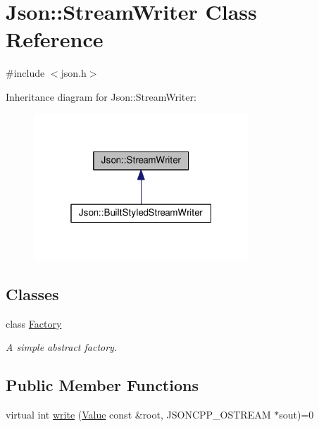 \hypertarget{class_json_1_1_stream_writer}{}\section{Json\+:\+:Stream\+Writer Class Reference}
\label{class_json_1_1_stream_writer}


{\ttfamily \#include $<$json.\+h$>$}



Inheritance diagram for Json\+:\+:Stream\+Writer\+:
\nopagebreak
\begin{figure}[H]
\begin{center}
\leavevmode
\includegraphics[width=229pt]{class_json_1_1_stream_writer__inherit__graph}
\end{center}
\end{figure}
\subsection*{Classes}
\begin{DoxyCompactItemize}
\item 
class \hyperlink{class_json_1_1_stream_writer_1_1_factory}{Factory}
\begin{DoxyCompactList}\small\item\em A simple abstract factory. \end{DoxyCompactList}\end{DoxyCompactItemize}
\subsection*{Public Member Functions}
\begin{DoxyCompactItemize}
\item 
virtual int \hyperlink{class_json_1_1_stream_writer_a84278bad0c9a9fc587bc2a97c5bb5993}{write} (\hyperlink{class_json_1_1_value}{Value} const \&root, J\+S\+O\+N\+C\+P\+P\+\_\+\+O\+S\+T\+R\+E\+AM $\ast$sout)=0
\end{DoxyCompactItemize}
